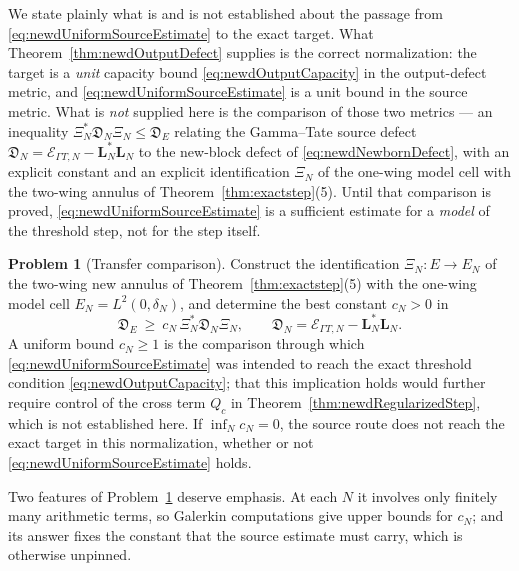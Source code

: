 \documentclass[11pt]{amsart}
\theoremstyle{definition}
\newtheorem{problem}[theorem]{Problem}
\theoremstyle{remark}
\begin{document}
We state plainly what is and is not established about the passage from
\eqref{eq:newdUniformSourceEstimate} to the exact target.  What
Theorem~\ref{thm:newdOutputDefect} supplies is the correct normalization: the
target is a \emph{unit} capacity bound \eqref{eq:newdOutputCapacity} in the
output-defect metric, and \eqref{eq:newdUniformSourceEstimate} is a unit bound
in the source metric.  What is \emph{not} supplied here is the comparison of
those two metrics --- an inequality
\(\Xi_N^*\mathfrak D_N\Xi_N\le\mathfrak D_E\) relating the Gamma--Tate source
defect \(\mathfrak D_N=\mathcal E_{\Gamma T,N}-\mathbf L_N^*\mathbf L_N\) to
the new-block defect of \eqref{eq:newdNewbornDefect}, with an explicit
constant and an explicit identification \(\Xi_N\) of the one-wing model cell
with the two-wing annulus of Theorem~\ref{thm:exactstep}(5).  Until that
comparison is proved, \eqref{eq:newdUniformSourceEstimate} is a sufficient
estimate for a \emph{model} of the threshold step, not for the step itself.

\begin{problem}[Transfer comparison]\label{prob:newdTransferComparison}
Construct the identification \(\Xi_N:E\to E_N\) of the two-wing new
annulus of Theorem~\ref{thm:exactstep}(5) with the one-wing model cell
\(E_N=L^2(0,\delta_N)\), and determine the best constant \(c_N>0\) in
\[
 \mathfrak D_E\ \ge\ c_N\,\Xi_N^*\mathfrak D_N\Xi_N,
 \qquad
 \mathfrak D_N=\mathcal E_{\Gamma T,N}-\mathbf L_N^*\mathbf L_N .
\]
A uniform bound \(c_N\ge1\) is the comparison through which
\eqref{eq:newdUniformSourceEstimate} was intended to reach the exact
threshold condition \eqref{eq:newdOutputCapacity}; that this implication
holds would further require control of the cross term \(Q_c\) in
Theorem~\ref{thm:newdRegularizedStep}, which is not established here.  If
\(\inf_Nc_N=0\), the source route does not reach the exact target in this
normalization, whether or not
\eqref{eq:newdUniformSourceEstimate} holds.
\end{problem}

Two features of Problem~\ref{prob:newdTransferComparison} deserve emphasis.
At each \(N\) it involves only finitely many arithmetic terms, so Galerkin
computations give upper bounds for \(c_N\); and its answer fixes the constant that the source
estimate must carry, which is otherwise unpinned.
\end{document}
